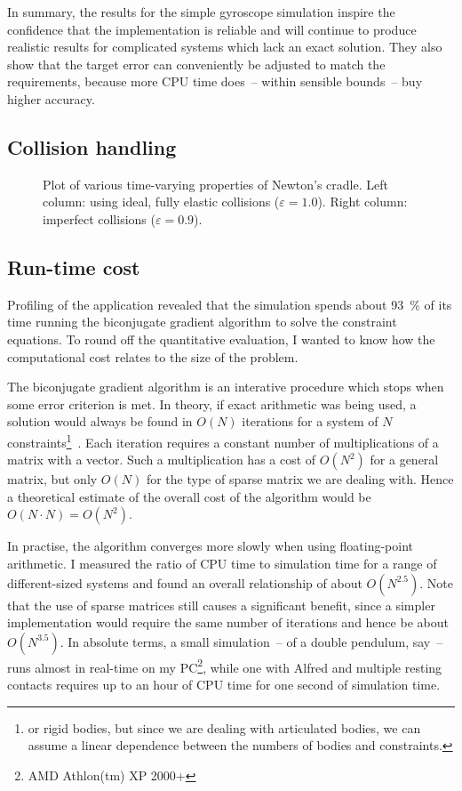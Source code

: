 In summary, the results for the simple gyroscope simulation inspire the confidence that the
implementation is reliable and will continue to produce realistic results for complicated systems
which lack an exact solution. They also show that the target error can conveniently be adjusted
to match the requirements, because more CPU time does~-- within sensible bounds~-- buy higher
accuracy.


\subsection{Collision handling}

\begin{figure}
\centerline{}
\caption{Plot of various time-varying properties of Newton's cradle. Left column: using ideal,
    fully elastic collisions ($\varepsilon = 1.0$). Right column: imperfect collisions
    ($\varepsilon = 0.9$).\label{cradlePlots}}
\end{figure}


\subsection{Run-time cost}

Profiling of the application revealed that the simulation spends about 93~\% of its time running
the biconjugate gradient algorithm to solve the constraint equations. To round off the quantitative
evaluation, I wanted to know how the computational cost relates to the size of the problem.

The biconjugate gradient algorithm is an interative procedure which stops when some error
criterion is met. In theory, if exact arithmetic was being used, a solution would always be found
in $O(N)$ iterations for a system of $N$ constraints\footnote{or rigid bodies, but since we are
dealing with articulated bodies, we can assume a linear dependence between the numbers of bodies
and constraints.}~\cite{NRinC}. Each iteration requires a constant number of multiplications of a
matrix with a vector. Such a multiplication has a cost of $O(N^2)$ for a general matrix, but only
$O(N)$ for the type of sparse matrix we are dealing with. Hence a theoretical estimate of the
overall cost of the algorithm would be $O(N\cdot N) = O(N^2)$.

In practise, the algorithm converges more slowly when using floating-point arithmetic.
I measured the ratio of CPU time to simulation time for a range of different-sized systems and
found an overall relationship of about $O(N^{2.5})$. Note that the use of sparse matrices still
causes a significant benefit, since a simpler implementation would require the same number of
iterations and hence be about $O(N^{3.5})$. In absolute terms, a small simulation~-- of a
double pendulum, say~-- runs almost in real-time on my PC\footnote{AMD Athlon(tm) XP 2000+},
while one with Alfred and multiple resting contacts requires up to an hour of CPU time for one
second of simulation time.


